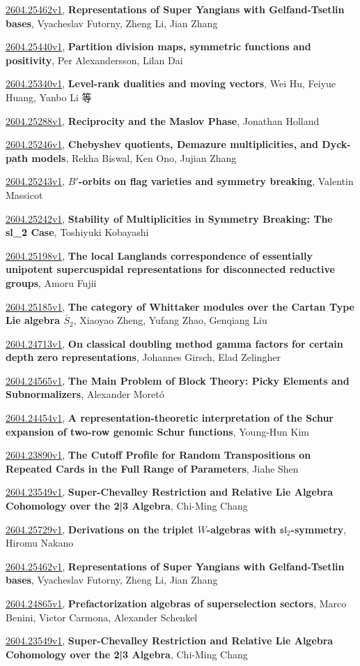 \documentclass[9pt, a4paper]{article}
\theoremstyle{plain}
\theoremstyle{definition}
\theoremstyle{remark}
\newcommand{\arxiv}[3]{\href{https://arxiv.org/abs/#1}{#1}, \textbf{\textcolor{arxivblue}{#2}}, #3}
\begin{document}
\arxiv{2604.25462v1}{Representations of Super Yangians with Gelfand-Tsetlin bases}{Vyacheslav Futorny, Zheng Li, Jian Zhang}

\arxiv{2604.25440v1}{Partition division maps, symmetric functions and positivity}{Per Alexandersson, Lilan Dai}

\arxiv{2604.25340v1}{Level-rank dualities and moving vectors}{Wei Hu, Feiyue Huang, Yanbo Li 等}

\arxiv{2604.25288v1}{Reciprocity and the Maslov Phase}{Jonathan Holland}

\arxiv{2604.25246v1}{Chebyshev quotients, Demazure multiplicities, and Dyck-path models}{Rekha Biswal, Ken Ono, Jujian Zhang}

\arxiv{2604.25243v1}{$B'$-orbits on flag varieties and symmetry breaking}{Valentin Massicot}

\arxiv{2604.25242v1}{Stability of Multiplicities in Symmetry Breaking: The sl_2 Case}{Toshiyuki Kobayashi}

\arxiv{2604.25198v1}{The local Langlands correspondence of essentially unipotent supercuspidal representations for disconnected reductive groups}{Amoru Fujii}

\arxiv{2604.25185v1}{The category of Whittaker modules over the Cartan Type Lie algebra $\bar{S}_2$}{Xiaoyao Zheng, Yufang Zhao, Genqiang Liu}

\arxiv{2604.24713v1}{On classical doubling method gamma factors for certain depth zero representations}{Johannes Girsch, Elad Zelingher}

\arxiv{2604.24565v1}{The Main Problem of Block Theory: Picky Elements and Subnormalizers}{Alexander Moretó}

\arxiv{2604.24454v1}{A representation-theoretic interpretation of the Schur expansion of two-row genomic Schur functions}{Young-Hun Kim}

\arxiv{2604.23890v1}{The Cutoff Profile for Random Transpositions on Repeated Cards in the Full Range of Parameters}{Jiahe Shen}

\arxiv{2604.23549v1}{Super-Chevalley Restriction and Relative Lie Algebra Cohomology over the 2|3 Algebra}{Chi-Ming Chang}

\arxiv{2604.25729v1}{Derivations on the triplet $W$-algebras with $\mathfrak{sl}_2$-symmetry}{Hiromu Nakano}

\arxiv{2604.25462v1}{Representations of Super Yangians with Gelfand-Tsetlin bases}{Vyacheslav Futorny, Zheng Li, Jian Zhang}

\arxiv{2604.24865v1}{Prefactorization algebras of superselection sectors}{Marco Benini, Victor Carmona, Alexander Schenkel}

\arxiv{2604.23549v1}{Super-Chevalley Restriction and Relative Lie Algebra Cohomology over the 2|3 Algebra}{Chi-Ming Chang}

\end{document}
